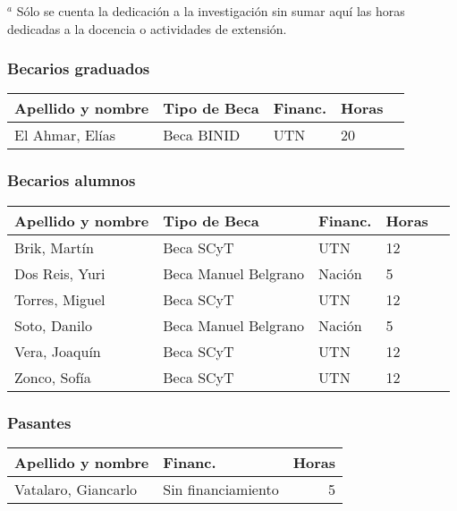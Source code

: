 \documentclass[a4paper,11pt,twoside,final,titlepage,onecolumn,openright]{report}
\begin{document}
\normalsize
\vspace{0.5cm}
$^a$ Sólo se cuenta la dedicación a la investigación sin sumar aquí las horas dedicadas a la docencia o actividades de extensión.

\subsubsection{Becarios graduados}

 \begin{tabular}{l l l l r}
 \toprule
 Apellido y nombre & Tipo de Beca & Financ. & Horas \\
 \midrule
 El Ahmar, Elías & Beca BINID & UTN & 20\\
 \bottomrule 
 \end{tabular}

\subsubsection{Becarios alumnos}

\begin{tabular}{l l l l r}
\toprule
Apellido y nombre & Tipo de Beca & Financ. & Horas \\
\midrule
Brik, Martín & Beca SCyT & UTN & 12 \\
Dos Reis, Yuri & Beca Manuel Belgrano & Nación & 5 \\
Torres, Miguel & Beca SCyT & UTN & 12 \\
Soto, Danilo & Beca Manuel Belgrano & Nación & 5 \\
Vera, Joaquín & Beca SCyT & UTN & 12 \\
Zonco, Sofía & Beca SCyT & UTN & 12 \\
\bottomrule 
\end{tabular}

 \subsubsection{Pasantes}
\begin{tabular}{l l r}
\toprule
Apellido y nombre & Financ. & Horas \\
\midrule
Vatalaro, Giancarlo & Sin financiamiento & 5\\
\bottomrule
\end{tabular}

\normalsize
\vspace{0.5cm}

\end{document}
